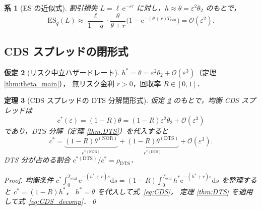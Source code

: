 \documentclass[12pt,a4paper]{article}
\theoremstyle{plain}
\newtheorem{theorem}{定理}[section]
\newtheorem{corollary}[theorem]{系}
\theoremstyle{definition}
\newtheorem{assumption}[theorem]{仮定}
\theoremstyle{remark}
\newcommand{\calO}{\mathcal{O}}
\newcommand{\eps}{\varepsilon}
\newcommand{\e}{\mathrm{e}}
\newcommand{\ES}{\mathrm{ES}}
\newcommand{\dd}{\mathrm{d}}
\newcommand{\thetaNOR}{\theta^{(\mathrm{NOR})}}
\newcommand{\thetaDTS}{\theta^{(\mathrm{DTS})}}
\newcommand{\rhoDTS}{\rho_{\mathrm{DTS}}}
\newcommand{\Teval}{T_{\mathrm{eval}}}
\begin{document}
\begin{corollary}[ES の近似式]\label{cor:ES}
  割引損失 $L=\ell\,\e^{-r\tau}$ に対し，$h\approx\theta=\eps^2\theta_2$ のもとで，
  \begin{equation}
    \ES_q(L)
    \approx \frac{\ell}{1-q}\cdot
    \frac{\theta}{\theta+r}\bigl(1-\e^{-(\theta+r)\Teval}\bigr)
    = \calO(\eps^2).
  \end{equation}
\end{corollary}

\subsection{CDS スプレッドの閉形式}

\begin{assumption}[リスク中立ハザードレート]\label{ass:RN}
  $h^* = \theta = \eps^2\theta_2 + \calO(\eps^3)$（定理 \ref{thm:theta_main}），
  無リスク金利 $r>0$，回収率 $R\in[0,1]$．
\end{assumption}

\begin{theorem}[CDS スプレッドの DTS 分解閉形式]\label{thm:CDS}
  仮定 \ref{ass:RN} のもとで，均衡 CDS スプレッドは
  \begin{equation}\label{eq:CDS}
    c^*(\eps) = (1-R)\theta = (1-R)\eps^2\theta_2+\calO(\eps^3)
  \end{equation}
  であり，DTS 分解（定理 \ref{thm:DTS}）を代入すると
  \begin{equation}\label{eq:CDS_decomp}
    c^* = \underbrace{(1-R)\thetaNOR}_{c^{*(\mathrm{NOR})}}
        + \underbrace{(1-R)\thetaDTS}_{c^{*(\mathrm{DTS})}} + \calO(\eps^3).
  \end{equation}
  DTS 分が占める割合 $c^{*(\mathrm{DTS})}/c^* = \rhoDTS$．

  \begin{proof}
    均衡条件 $c^*\int_0^{\Teval}\e^{-(h^*+r)s}\dd s
    = (1-R)\int_0^{\Teval} h^*\e^{-(h^*+r)s}\dd s$ を整理すると $c^*=(1-R)h^*$，
    $h^*=\theta$ を代入して式~\eqref{eq:CDS}，
    定理 \ref{thm:DTS} を適用して式~\eqref{eq:CDS_decomp}．\qed
  \end{proof}
\end{theorem}
\end{document}
